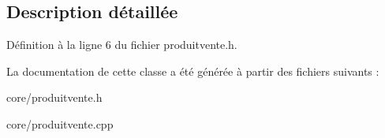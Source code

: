 \subsection{Description détaillée}


Définition à la ligne 6 du fichier produitvente.h.



La documentation de cette classe a été générée à partir des fichiers suivants :\begin{DoxyCompactItemize}
\item 
core/produitvente.h\item 
core/produitvente.cpp\end{DoxyCompactItemize}
